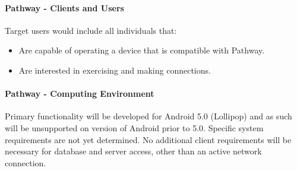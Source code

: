 \documentclass{article}
\begin{document}
\paragraph{Pathway - Clients and Users}
Target users would include all individuals that:
\begin{itemize}
    \item Are capable of operating a device that is compatible with Pathway.
    \item Are interested in exercising and making connections.
\end{itemize}

\paragraph{Pathway - Computing Environment}
Primary functionality will be developed for Android 5.0 (Lollipop) and as such will be unsupported on version of Android prior to 5.0. Specific system requirements are not yet determined. No additional client requirements will be necessary for database and server access, other than an active network connection.
\end{document}
